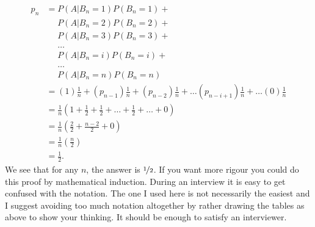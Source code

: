 \documentclass[a4paper]{article}
\begin{document}
\begin{align*}
  p_n
  &=
                         P(A|B_n = 1)P(B_n=1) + {}\\
  &\phantom{{} = {}} P(A|B_n = 2)P(B_n=2) +{} \\
  &\phantom{{} = {}} P(A|B_n = 3)P(B_n=3) +{} \\
  &\phantom{{} = {}} \ldots  \\
  &\phantom{{} = {}} P(A|B_n = i)P(B_n=i) +{} \\
  &\phantom{{} = {}} \ldots  \\
  &\phantom{{} = {}} P(A|B_n = n)P(B_n=n) \\
&= (1)       \frac{1}{n}  +
   (p_{n-1}) \frac{1}{n}  +
   (p_{n-2}) \frac{1}{n}  +
  \ldots
  (p_{n-i+1})\frac{1}{n} +
  \ldots
  (0)        \frac{1}{n}  \\
&=\frac{1}{n}\left(1 +  \frac{1}{2} + \frac{1}{2} + \ldots + \frac{1}{2} + \ldots + 0\right) \\
&=\frac{1}{n}\left(\frac{2}{2} + \frac{n-2}{2} + 0\right) \\
&=\frac{1}{n}\left(\frac{n}{2}\right)  \\
&=\frac{1}{2}
\text{.}
\end{align*}
We see that for any $n$, the answer is $\nicefrac{1}{2}$.
If you want more rigour you could do this proof by mathematical induction.
During an interview it is easy to get confused with the notation.
The one I used here is not necessarily the easiest and I suggest avoiding too much notation altogether by rather drawing the tables as above to show your thinking.
It should be enough to satisfy an interviewer.
\end{document}

